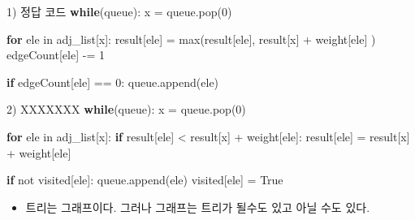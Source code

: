 \documentclass[11pt]{article}
\providecommand{\tightlist}{%
      \setlength{\itemsep}{0pt}\setlength{\parskip}{0pt}}
\newenvironment{Shaded}{}{}
\newcommand{\DecValTok}[1]{\textcolor[rgb]{0.25,0.63,0.44}{{#1}}}
\newcommand{\NormalTok}[1]{{#1}}
\newcommand{\ControlFlowTok}[1]{\textcolor[rgb]{0.00,0.44,0.13}{\textbf{{#1}}}}
\begin{document}
\begin{Shaded}
\begin{Highlighting}[]
\DecValTok{1}\NormalTok{) 정답 코드}
\ControlFlowTok{while}\NormalTok{(queue):}
\NormalTok{    x = queue.pop(}\DecValTok{0}\NormalTok{)}

    \ControlFlowTok{for}\NormalTok{ ele in adj_list[x]:}
\NormalTok{        result[ele]     = max(result[ele], result[x] + weight[ele] )}
\NormalTok{        edgeCount[ele] -= }\DecValTok{1}

        \ControlFlowTok{if}\NormalTok{ edgeCount[ele] == }\DecValTok{0}\NormalTok{:}
\NormalTok{            queue.append(ele)}
                    
\DecValTok{2}\NormalTok{) XXXXXXX        }
\ControlFlowTok{while}\NormalTok{(queue):}
\NormalTok{    x = queue.pop(}\DecValTok{0}\NormalTok{)}

    \ControlFlowTok{for}\NormalTok{ ele in adj_list[x]:}
        \ControlFlowTok{if}\NormalTok{ result[ele] < result[x] + weight[ele]:}
\NormalTok{            result[ele] = result[x] + weight[ele]}

        \ControlFlowTok{if}\NormalTok{ not visited[ele]:}
\NormalTok{            queue.append(ele)}
\NormalTok{            visited[ele] = True       }
\end{Highlighting}
\end{Shaded}

\begin{itemize}
\tightlist
\item
  트리는 그래프이다. 그러나 그래프는 트리가 될수도 있고 아닐 수도 있다.
\end{itemize}
\end{document}
